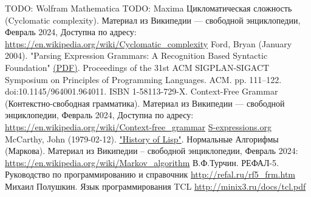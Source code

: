 \documentclass[10pt]{report}
\begin{document}
\begin{thebibliography}{10}
 TODO: Wolfram Mathematica
 TODO: Maxima
 Цикломатическая сложность (Cyclomatic complexity). Материал из Википедии — свободной энциклопедии, Февраль 2024, Доступна по адресу:  \url{https://en.wikipedia.org/wiki/Cyclomatic_complexity}
  Ford, Bryan (January 2004). "Parsing Expression Grammars: A Recognition Based Syntactic Foundation" \href{https://bford.info/pub/lang/peg.pdf}{(PDF)}. Proceedings of the 31st ACM SIGPLAN-SIGACT Symposium on Principles of Programming Languages. ACM. pp. 111–122. doi:10.1145/964001.964011. ISBN 1-58113-729-X.
 Context-Free Grammar (Контекстно-свободная грамматика). Материал из Википедии — свободной энциклопедии, Февраль 2024, Доступна по адресу: \url{https://en.wikipedia.org/wiki/Context-free_grammar}
 \url{S-expressions.org}
 McCarthy, John (1979-02-12). \href{http://www-formal.stanford.edu/jmc/history/lisp/lisp.html}{"History of Lisp"}.
 Нормальные Алгорифмы (Маркова). Материал из Википедии -- свободной энциклопедии, Февраль 2024: \url{https://en.wikipedia.org/wiki/Markov_algorithm}
 В.Ф.Турчин. РЕФАЛ-5. Руководство по программированию и справочник \url{http://refal.ru/rf5_frm.htm}
 Михаил Полушкин. Язык программирования TCL \url{http://minix3.ru/docs/tcl.pdf}
\end{thebibliography}
\end{document}
